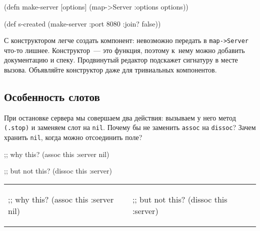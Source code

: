 \else

\begin{english}
  \begin{clojure}
(defn make-server
  [options]
  (map->Server {:options options}))

(def s-created (make-server {:port 8080 :join? false}))
  \end{clojure}
\end{english}

\fi

С конструктором легче создать компонент: невозможно передать в
\verb|map->Server| что-то лишнее. Конструктор~--- это функция, поэтому к~нему
можно добавить документацию и спеку. Продвинутый редактор подскажет сигнатуру в
месте вызова. Объявляйте конструктор даже для тривиальных компонентов.

\subsection{Особенность слотов}

При остановке сервера мы совершаем два действия: вызываем у него метод
\verb|(.stop)| и заменяем слот на \verb|nil|. Почему бы не заменить
\verb|assoc| на \verb|dissoc|? Зачем хранить \verb|nil|, когда можно
отсоединить поле?

\ifnarrow

\begin{english}
  \begin{clojure}
;; why this?
(assoc this :server nil)
  \end{clojure}

\splitter

  \begin{clojure}
;; but not this?
(dissoc this :server)
  \end{clojure}
\end{english}

\else

\begin{english}

\noindent
\begin{tabular}{ @{}p{5cm} @{}p{5cm} }

  \begin{clojure}
;; why this?
(assoc this :server nil)
  \end{clojure}

&

  \begin{clojure}
;; but not this?
(dissoc this :server)
  \end{clojure}

\end{tabular}

\end{english}

